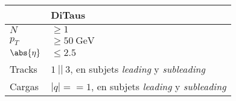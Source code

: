 \begin{tabular}{L{15mm} C{90mm}}
\toprule
             & DiTaus                                                           \\
\midrule
$N$          & $\geq 1$                                                         \\
$p_T$        & $\geq \SI{50}{\GeV}$                                             \\
$\abs{\eta}$ & $\leq 2.5$                                                       \\
Tracks       & $1 \ || \ 3$, en subjets \textit{leading} y \textit{subleading}  \\
Cargas       & $|q| == 1$, en subjets \textit{leading} y \textit{subleading}    \\
\bottomrule
\end{tabular}
